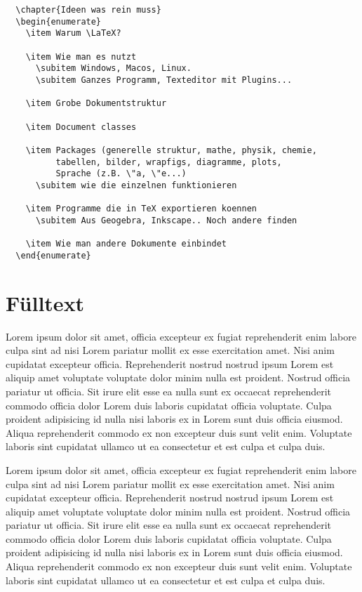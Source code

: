 \documentclass{book}
\begin{document}
\begin{verbatim}
  \chapter{Ideen was rein muss}
  \begin{enumerate}
    \item Warum \LaTeX?

    \item Wie man es nutzt
      \subitem Windows, Macos, Linux.
      \subitem Ganzes Programm, Texteditor mit Plugins...

    \item Grobe Dokumentstruktur

    \item Document classes

    \item Packages (generelle struktur, mathe, physik, chemie, 
          tabellen, bilder, wrapfigs, diagramme, plots, 
          Sprache (z.B. \"a, \"e...)
      \subitem wie die einzelnen funktionieren

    \item Programme die in TeX exportieren koennen
      \subitem Aus Geogebra, Inkscape.. Noch andere finden

    \item Wie man andere Dokumente einbindet
  \end{enumerate}
\end{verbatim}


\chapter{F\"ulltext}

Lorem ipsum dolor sit amet, officia excepteur ex fugiat reprehenderit enim
labore culpa sint ad nisi Lorem pariatur mollit ex esse exercitation amet. Nisi
anim cupidatat excepteur officia. Reprehenderit nostrud nostrud ipsum Lorem est
aliquip amet voluptate voluptate dolor minim nulla est proident. Nostrud
officia pariatur ut officia. Sit irure elit esse ea nulla sunt ex occaecat
reprehenderit commodo officia dolor Lorem duis laboris cupidatat officia
voluptate. Culpa proident adipisicing id nulla nisi laboris ex in Lorem sunt
duis officia eiusmod. Aliqua reprehenderit commodo ex non excepteur duis sunt
velit enim. Voluptate laboris sint cupidatat ullamco ut ea consectetur et est
culpa et culpa duis.

Lorem ipsum dolor sit amet, officia excepteur ex fugiat reprehenderit enim
labore culpa sint ad nisi Lorem pariatur mollit ex esse exercitation amet. Nisi
anim cupidatat excepteur officia. Reprehenderit nostrud nostrud ipsum Lorem est
aliquip amet voluptate voluptate dolor minim nulla est proident. Nostrud
officia pariatur ut officia. Sit irure elit esse ea nulla sunt ex occaecat
reprehenderit commodo officia dolor Lorem duis laboris cupidatat officia
voluptate. Culpa proident adipisicing id nulla nisi laboris ex in Lorem sunt
duis officia eiusmod. Aliqua reprehenderit commodo ex non excepteur duis sunt
velit enim. Voluptate laboris sint cupidatat ullamco ut ea consectetur et est
culpa et culpa duis.
\end{document}
